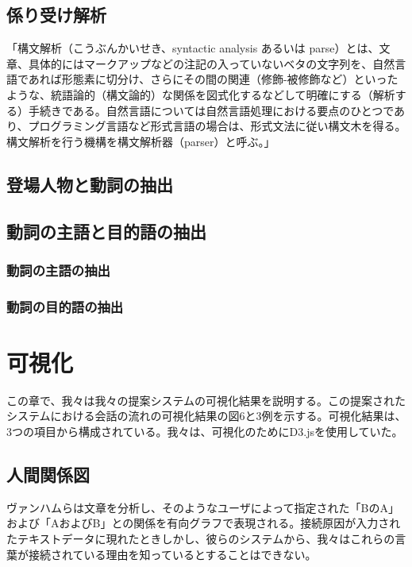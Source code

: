 \documentclass[shuuron]{kuee}
\begin{document}
  \subsection{係り受け解析}


「構文解析（こうぶんかいせき、syntactic analysis あるいは parse）とは、文章、具体的にはマークアップなどの注記の入っていないベタの文字列を、自然言語であれば形態素に切分け、さらにその間の関連（修飾-被修飾など）といったような、統語論的（構文論的）な関係を図式化するなどして明確にする（解析する）手続きである。自然言語については自然言語処理における要点のひとつであり、プログラミング言語など形式言語の場合は、形式文法に従い構文木を得る。構文解析を行う機構を構文解析器（parser）と呼ぶ。」


  \subsection{登場人物と動詞の抽出}


  \subsection{動詞の主語と目的語の抽出}

\subsubsection{動詞の主語の抽出}
\subsubsection{動詞の目的語の抽出}



\section{可視化}

この章で、我々は我々の提案システムの可視化結果を説明する。この提案されたシステムにおける会話の流れの可視化結果の図6と3例を示する。可視化結果は、3つの項目から構成されている。我々は、可視化のためにD3.js\cite{vand3}を使用していた。%



\subsection{人間関係図}

ヴァンハムら\cite{van2009mapping}は文章を分析し、そのようなユーザによって指定された「BのA」および「AおよびB」との関係を有向グラフで表現される。接続原因が入力されたテキストデータに現れたときしかし、彼らのシステムから、我々はこれらの言葉が接続されている理由を知っているとすることはできない。
\end{document}
